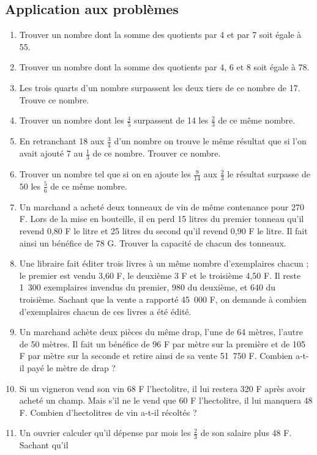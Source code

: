 \documentclass[12 pt]{extarticle}
\theoremstyle{plain}
\begin{document}
 \subsection{Application aux problèmes}
 \begin{enumerate}
 \item Trouver un nombre dont la somme des quotients par 
 4 et par 7 soit égale à 55. 
 \item Trouver un nombre dont la somme des quotients par 4, 6 et 8 soit égale à 78.
 \item Les trois quarts d'un nombre surpassent les deux tiers de ce nombre de 17. Trouve ce nombre.
 \item Trouver un nombre dont les $\frac45$ surpassent de 14 les $\frac23$ de ce même nombre. 
 \item En retranchant 18 aux $\frac34$ d'un nombre on trouve le même résultat que si l'on avait ajouté 7 au 
 $\frac13$ de ce nombre. Trouver ce nombre.
 \item Trouver un nombre tel que si on en ajoute les $\frac9{14}$ aux $\frac23$ le résultat surpasse de $50$ les $\frac56$ de ce même nombre.
\item Un marchand a acheté deux tonneaux de vin de même 
 contenance pour 270 F. Lors de la mise en bouteille, il 
 en perd 15 litres du premier tonneau qu'il revend 0,80 F 
 le litre et 25 litres du second qu'il revend 0,90 F le 
 litre. Il fait ainsi un bénéfice de 78 G. Trouver la 
 capacité de chacun des tonneaux. 
\item Une libraire fait éditer trois livres à un même 
 nombre d'exemplaires chacun ; le premier est vendu 3,60 
 F, le deuxième 3 F et le troisième 4,50 F. Il reste 1~300 
 exemplaires invendus du premier, 980 du deuxième, et 640 
 du troisième. Sachant que la vente a rapporté 45~000 F, 
 on demande à combien d'exemplaires chacun de ces livres a 
 été édité.
 \item Un marchand achète deux pièces du même drap, l'une 
 de 64 mètres, l'autre de 50 mètres. Il fait un bénéfice 
 de 96 F par mètre sur la première et de 105 F par mètre 
 sur la seconde et retire ainsi de sa vente 51~750 F. 
 Combien a-t-il payé le mètre de drap ? 
 \item Si un vigneron vend son vin 68 F l'hectolitre, il 
 lui restera 320 F après avoir acheté un champ. Mais s'il 
 ne le vend que 60 F l'hectolitre, il lui manquera 48 F. 
 Combien d'hectolitres de vin a-t-il récoltés ? 
 \item Un ouvrier calculer qu'il dépense par mois les 
 $\frac23$ de son salaire plus 48 F. Sachant qu'il 

\end{enumerate}
\end{document}
